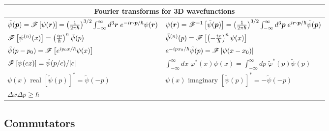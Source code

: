\begin{table}[h!]
    \centering
    \begin{tabular}{l|l}
        \multicolumn{2}{c}{Fourier transforms for 3D wavefunctions}\\
        \hline
        $\tilde{\psi}(\bp)=\fourier{\psi(\bR)}=\left(\frac{1}{2\pi\hbar}\right)^{3/2}\int_{-\infty}^\infty d^3\bR\;e^{-i\bR\cdot\bp/\hbar}\psi(\bR)$&$\psi(\bR)=\ifourier{\tilde{\psi}(\bp)}=\left(\frac{1}{2\pi\hbar}\right)^{3/2}\int_{-\infty}^\infty d^3\bp\;e^{i\bR\cdot\bp/\hbar}\tilde{\psi}(\bp)$\\
        $\fourier{\psi^{(n)}(x)}=\left(\frac{ip}{\hbar}\right)^n\tilde{\psi}(p)$&$\tilde{\psi}^{(n)}(p)=\fourier{\left(-\frac{ix}{\hbar}\right)^n\psi(x)}$\\
        $\tilde{\psi}(p-p_0)=\fourier{e^{ip_0x/\hbar}\psi(x)}$&$e^{-ipx_0/\hbar}\tilde{\psi}(p)=\fourier{\psi(x-x_0)}$\\
        $\fourier{\psi(cx)}=\tilde{\psi}(p/c)/|c|$&$\int_{-\infty}^\infty dx\;\varphi^*(x)\psi(x)=\int_{-\infty}^\infty dp\;\tilde{\varphi}^*(p)\tilde{\psi}(p)$\\
        $\psi(x)$ real $[\tilde{\psi}(p)]^*=\tilde{\psi}(-p)$&$\psi(x)$ imaginary $[\tilde{\psi}(p)]^*=-\tilde{\psi}(-p)$\\
        $\Delta x\Delta p\geq\hbar$&$$
    \end{tabular}
\end{table}
\begin{comment}
\end{comment}
\subsection*{Commutators}
\begin{table}[h!]
    \centering
\end{table} 

